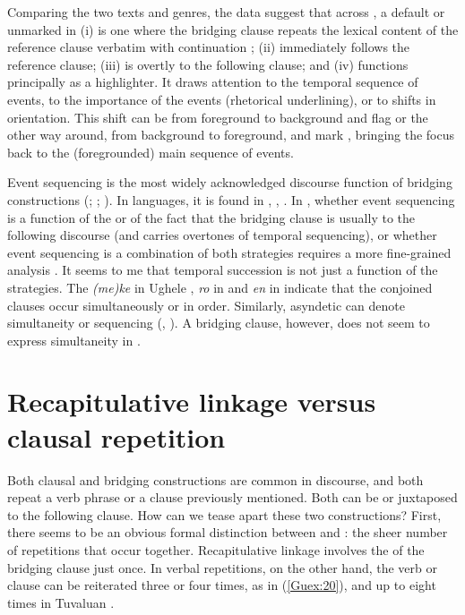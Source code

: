 \documentclass[output=paper]{LSP/langsci}
\begin{document}
Comparing the two texts and genres, the data suggest that across , a default or unmarked  in  (i) is one where the bridging clause repeats the lexical content of the reference clause verbatim with continuation ; (ii) immediately follows the reference clause; (iii) is overtly  to the following clause; and (iv) functions principally as a highlighter. It draws attention to the temporal sequence of events, to the importance of the events (rhetorical underlining), or to shifts in orientation. This shift can be from foreground to background and flag  or the other way around, from background to foreground, and mark , bringing the focus back to the (foregrounded) main sequence of events. 

Event sequencing is the most widely acknowledged discourse function of bridging constructions (\citealt[][130, 242, 261]{hasan76};  \citealt[][370]{devries.2005}; \citealt[][273]{Thompson.et.al.2007}). In  languages, it is found in  \citep[][259]{dimock09},  \citep[427]{hyslop01},  \citep[24--26]{Schneider09}. In , whether event sequencing is a function of the  or of the fact that the bridging clause is usually  to the following discourse (and  carries overtones of temporal sequencing), or whether event sequencing is a combination of both strategies requires a more fine-grained analysis \citep[see also][325]{guerin11}. It seems to me that temporal succession is not just a function of the  strategies. The  \textit{(me)ke} in Ughele \citep[][242]{Frostad2012}, \textit{ro} in  \citep[][322]{guerin11} and \textit{en} in  \citep[][230--231]{dimock09} indicate that the conjoined clauses occur simultaneously or in  order. Similarly, asyndetic  can denote simultaneity or sequencing (\citealt[][241]{Frostad2012}, \citealt[][425--426]{hyslop01}). A bridging clause, however, does not seem to express simultaneity in . 


\section{Recapitulative linkage versus clausal repetition}
\label{Gurepetition}
Both clausal  and bridging constructions are common in  discourse, and both repeat a verb phrase or a clause previously mentioned. Both can be  or juxtaposed to the following clause. How can we tease apart these two constructions?  First, there seems to be an obvious formal distinction between  and : the sheer number of repetitions that occur together. Recapitulative linkage involves the  of the bridging clause just once. In verbal repetitions, on the other hand, the verb or clause can be reiterated three or four times, as in (\ref{Guex:20}), and up to eight times in Tuvaluan \citep[][487]{besnier00}.
\end{document}
